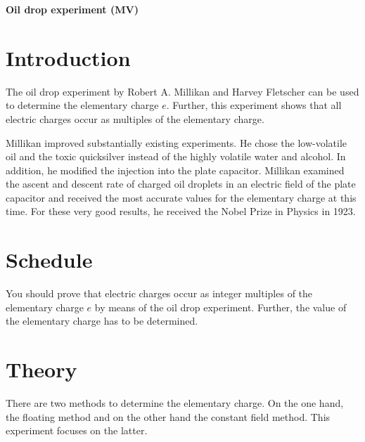 \documentclass{tudphygp_eng}
\author{dont know}
\date{Stand: 10.03.2015}
\begin{document}
\maketitle

\vspace{5mm}
\centerline{\bf\LARGE Oil drop experiment (MV)}


\section{Introduction}

The oil drop experiment by Robert A. Millikan and Harvey Fletscher can be used to determine the elementary charge $e$. Further, this experiment shows that all electric charges occur as multiples of the elementary charge.

Millikan improved substantially existing experiments. He chose the low-volatile oil and the toxic quicksilver instead of the highly volatile water and alcohol. In addition, he modified the injection into the plate capacitor. Millikan examined the ascent and descent rate of charged oil droplets in an electric field of the plate capacitor and received the most accurate values for the elementary charge at this time. For these very good results, he received the Nobel Prize in Physics in 1923.

\section{Schedule}

You should prove that electric charges occur as integer multiples of the elementary charge $e$ by means of the oil drop experiment. Further, the value of the elementary charge has to be determined.

\section{Theory}

There are two methods to determine the elementary charge. On the one hand, the floating method and on the other hand the constant field method. This experiment focuses on the latter.
\end{document}
